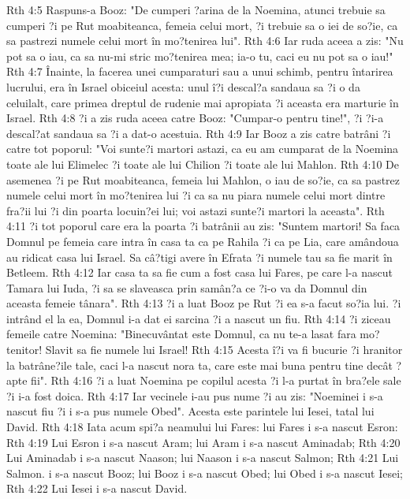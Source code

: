 Rth 4:5  Raspuns-a Booz: "De cumperi ?arina de la Noemina, atunci trebuie sa cumperi ?i pe Rut moabiteanca, femeia celui mort, ?i trebuie sa o iei de so?ie, ca sa pastrezi numele celui mort în mo?tenirea lui".
Rth 4:6  Iar ruda aceea a zis: "Nu pot sa o iau, ca sa nu-mi stric mo?tenirea mea; ia-o tu, caci eu nu pot sa o iau!"
Rth 4:7  Înainte, la facerea unei cumparaturi sau a unui schimb, pentru întarirea lucrului, era în Israel obiceiul acesta: unul î?i descal?a sandaua sa ?i o da celuilalt, care primea dreptul de rudenie mai apropiata ?i aceasta era marturie în Israel.
Rth 4:8  ?i a zis ruda aceea catre Booz: "Cumpar-o pentru tine!", ?i ?i-a descal?at sandaua sa ?i a dat-o acestuia.
Rth 4:9  Iar Booz a zis catre batrâni ?i catre tot poporul: "Voi sunte?i martori astazi, ca eu am cumparat de la Noemina toate ale lui Elimelec ?i toate ale lui Chilion ?i toate ale lui Mahlon.
Rth 4:10  De asemenea ?i pe Rut moabiteanca, femeia lui Mahlon, o iau de so?ie, ca sa pastrez numele celui mort în mo?tenirea lui ?i ca sa nu piara numele celui mort dintre fra?ii lui ?i din poarta locuin?ei lui; voi astazi sunte?i martori la aceasta".
Rth 4:11  ?i tot poporul care era la poarta ?i batrânii au zis: "Suntem martori! Sa faca Domnul pe femeia care intra în casa ta ca pe Rahila ?i ca pe Lia, care amândoua au ridicat casa lui Israel. Sa câ?tigi avere în Efrata ?i numele tau sa fie marit în Betleem.
Rth 4:12  Iar casa ta sa fie cum a fost casa lui Fares, pe care l-a nascut Tamara lui Iuda, ?i sa se slaveasca prin samân?a ce ?i-o va da Domnul din aceasta femeie tânara".
Rth 4:13  ?i a luat Booz pe Rut ?i ea s-a facut so?ia lui. ?i intrând el la ea, Domnul i-a dat ei sarcina ?i a nascut un fiu.
Rth 4:14  ?i ziceau femeile catre Noemina: "Binecuvântat este Domnul, ca nu te-a lasat fara mo?tenitor! Slavit sa fie numele lui Israel!
Rth 4:15  Acesta î?i va fi bucurie ?i hranitor la batrâne?ile tale, caci l-a nascut nora ta, care este mai buna pentru tine decât ?apte fii".
Rth 4:16  ?i a luat Noemina pe copilul acesta ?i l-a purtat în bra?ele sale ?i i-a fost doica.
Rth 4:17  Iar vecinele i-au pus nume ?i au zis: "Noeminei i s-a nascut fiu ?i i s-a pus numele Obed". Acesta este parintele lui Iesei, tatal lui David.
Rth 4:18  Iata acum spi?a neamului lui Fares: lui Fares i s-a nascut Esron:
Rth 4:19  Lui Esron i s-a nascut Aram; lui Aram i s-a nascut Aminadab;
Rth 4:20  Lui Aminadab i s-a nascut Naason; lui Naason i s-a nascut Salmon;
Rth 4:21  Lui Salmon. i s-a nascut Booz; lui Booz i s-a nascut Obed; lui Obed i s-a nascut Iesei;
Rth 4:22  Lui Iesei i s-a nascut David.


